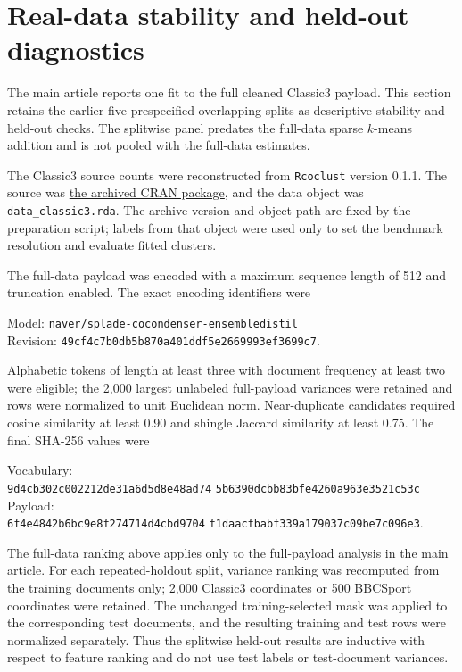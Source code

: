 \documentclass[preprint,12pt,authoryear]{elsarticle}
\begin{document}


\clearpage
\section{Real-data stability and held-out diagnostics}
\label{sec:s-realdata-diagnostics}

The main article reports one fit to the full cleaned Classic3 payload.
This section retains the earlier five prespecified overlapping splits as
descriptive stability and held-out checks. The splitwise panel predates the
full-data sparse $k$-means addition and is not pooled with the full-data
estimates.

The Classic3 source counts were reconstructed from \texttt{Rcoclust} version
0.1.1. The source was
\href{https://cran.r-project.org/src/contrib/Archive/Rcoclust/Rcoclust_0.1.1.tar.gz}{the archived CRAN package},
and the data object was \texttt{data\_classic3.rda}. The archive version and
object path are fixed by the preparation script; labels from that object were
used only to set the benchmark resolution and evaluate fitted clusters.

The full-data payload was encoded with a maximum sequence length of 512 and
truncation enabled. The exact encoding identifiers were

\begingroup\footnotesize
\noindent Model:
\texttt{naver/splade-cocondenser-}\allowbreak\texttt{ensembledistil}\\
Revision:
\texttt{49cf4c7b0db5b870a401}\allowbreak\texttt{ddf5e2669993ef3699c7}.
\endgroup

Alphabetic tokens of length at least three with
document frequency at least two were eligible; the 2,000 largest unlabeled
full-payload variances were retained and rows were normalized to unit
Euclidean norm. Near-duplicate candidates required cosine similarity at least
0.90 and shingle Jaccard similarity at least 0.75. The final SHA-256 values
were

\begingroup\footnotesize
\noindent Vocabulary:\\
\texttt{9d4cb302c002212de31a6d5d8e48ad74}\allowbreak
\texttt{5b6390dcbb83bfe4260a963e3521c53c}\\
Payload:\\
\texttt{6f4e4842b6bc9e8f274714d4cbd9704}\allowbreak
\texttt{f1daacfbabf339a179037c09be7c096e3}.
\endgroup

The full-data ranking above applies only to the full-payload analysis in
the main article. For each repeated-holdout split, variance ranking was
recomputed from the training documents only; 2,000 Classic3 coordinates or
500 BBCSport coordinates were retained. The unchanged training-selected mask
was applied to the corresponding test documents, and the resulting training
and test rows were normalized separately. Thus the splitwise held-out results
are inductive with respect to feature ranking and do not use test labels or
test-document variances.
\end{document}
